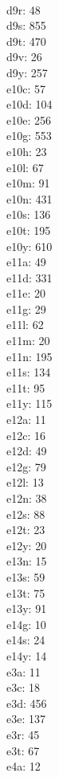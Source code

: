 \begin{multicols}{8}
  \\ d9r: 48
  \\ d9s: 855
  \\ d9t: 470
  \\ d9v: 26
  \\ d9y: 257
  \\ e10c: 57
  \\ e10d: 104
  \\ e10e: 256
  \\ e10g: 553
  \\ e10h: 23
  \\ e10l: 67
  \\ e10m: 91
  \\ e10n: 431
  \\ e10s: 136
  \\ e10t: 195
  \\ e10y: 610
  \\ e11a: 49
  \\ e11d: 331
  \\ e11e: 20
  \\ e11g: 29
  \\ e11l: 62
  \\ e11m: 20
  \\ e11n: 195
  \\ e11s: 134
  \\ e11t: 95
  \\ e11y: 115
  \\ e12a: 11
  \\ e12c: 16
  \\ e12d: 49
  \\ e12g: 79
  \\ e12l: 13
  \\ e12n: 38
  \\ e12s: 88
  \\ e12t: 23
  \\ e12y: 20
  \\ e13n: 15
  \\ e13s: 59
  \\ e13t: 75
  \\ e13y: 91
  \\ e14g: 10
  \\ e14s: 24
  \\ e14y: 14
  \\ e3a: 11
  \\ e3c: 18
  \\ e3d: 456
  \\ e3e: 137
  \\ e3r: 45
  \\ e3t: 67
  \\ e4a: 12

\end{multicols}
